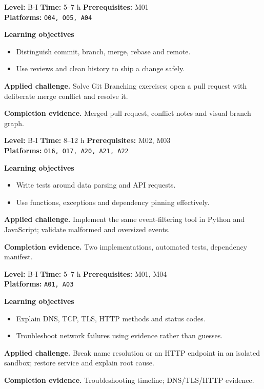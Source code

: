 \documentclass[10pt,letterpaper,oneside]{article}
\begin{document}
\vspace{2.5pt}
\begin{skillbox}[title={M03 \quad Git collaboration and branching}]
\textbf{Level:} B-I \quad \textbf{Time:} 5--7 h \quad \textbf{Prerequisites:} M01\\
\textbf{Platforms:} \texttt{O04, O05, A04}\par
\textbf{Learning objectives}
\begin{itemize}
\item Distinguish commit, branch, merge, rebase and remote.
\item Use reviews and clean history to ship a change safely.
\end{itemize}
\textbf{Applied challenge.} Solve Git Branching exercises; open a pull request with deliberate merge conflict and resolve it.\par
\textbf{Completion evidence.} Merged pull request, conflict notes and visual branch graph.\par
\end{skillbox}
\vspace{2.5pt}
\begin{skillbox}[title={M04 \quad Programming with Python and JavaScript}]
\textbf{Level:} B-I \quad \textbf{Time:} 8--12 h \quad \textbf{Prerequisites:} M02, M03\\
\textbf{Platforms:} \texttt{O16, O17, A20, A21, A22}\par
\textbf{Learning objectives}
\begin{itemize}
\item Write tests around data parsing and API requests.
\item Use functions, exceptions and dependency pinning effectively.
\end{itemize}
\textbf{Applied challenge.} Implement the same event-filtering tool in Python and JavaScript; validate malformed and oversized events.\par
\textbf{Completion evidence.} Two implementations, automated tests, dependency manifest.\par
\end{skillbox}
\vspace{2.5pt}
\begin{skillbox}[title={M05 \quad Networking, DNS and HTTP}]
\textbf{Level:} B-I \quad \textbf{Time:} 5--7 h \quad \textbf{Prerequisites:} M01, M04\\
\textbf{Platforms:} \texttt{A01, A03}\par
\textbf{Learning objectives}
\begin{itemize}
\item Explain DNS, TCP, TLS, HTTP methods and status codes.
\item Troubleshoot network failures using evidence rather than guesses.
\end{itemize}
\textbf{Applied challenge.} Break name resolution or an HTTP endpoint in an isolated sandbox; restore service and explain root cause.\par
\textbf{Completion evidence.} Troubleshooting timeline; DNS/TLS/HTTP evidence.\par
\end{skillbox}
\end{document}
